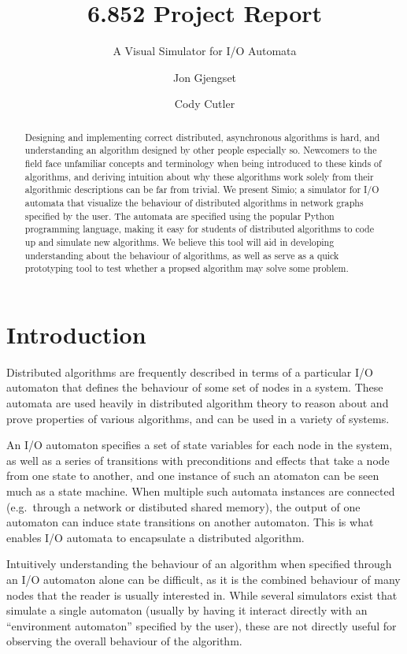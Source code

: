 \documentclass{scrartcl}
\title{6.852 Project Report}
\subtitle{A Visual Simulator for I/O Automata}
\author{Jon Gjengset \and Cody Cutler}
\begin{document}
\maketitle
\begin{abstract}
	Designing and implementing correct distributed, asynchronous algorithms
	is hard, and understanding an algorithm designed by other people
	especially so. Newcomers to the field face unfamiliar concepts and
	terminology when being introduced to these kinds of algorithms, and
	deriving intuition about why these algorithms work solely from their
	algorithmic descriptions can be far from trivial. We present Simio; a
	simulator for I/O automata that visualize the behaviour of distributed
	algorithms in network graphs specified by the user. The automata are
	specified using the popular Python programming language, making it easy
	for students of distributed algorithms to code up and simulate new
	algorithms. We believe this tool will aid in developing understanding
	about the behaviour of algorithms, as well as serve as a quick
	prototyping tool to test whether a propsed algorithm may solve some
	problem.
\end{abstract}

\section{Introduction}
Distributed algorithms are frequently described in terms of a particular I/O
automaton that defines the behaviour of some set of nodes in a system. These
automata are used heavily in distributed algorithm theory to reason about and
prove properties of various algorithms, and can be used in a variety of
systems.

An I/O automaton specifies a set of state variables for each node in the
system, as well as a series of transitions with preconditions and effects that
take a node from one state to another, and one instance of such an atomaton can
be seen much as a state machine. When multiple such automata instances are
connected (e.g.\ through a network or distibuted shared memory), the output of
one automaton can induce state transitions on another automaton. This is what
enables I/O automata to encapsulate a distributed algorithm.

Intuitively understanding the behaviour of an algorithm when specified through
an I/O automaton alone can be difficult, as it is the combined behaviour of
many nodes that the reader is usually interested in. While several simulators
exist that simulate a single automaton (usually by having it interact directly
with an ``environment automaton'' specified by the user), these are not
directly useful for observing the overall behaviour of the algorithm.
\end{document}
